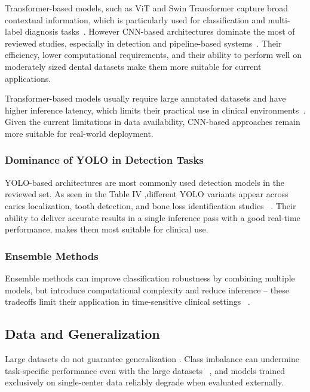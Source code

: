 \documentclass[conference]{IEEEtran}
\begin{document}
Transformer-based models, such as ViT and Swin Transformer capture broad contextual information, which is particularly used for classification and multi-label diagnosis tasks~\cite{vannistelrooij2024combining}. However CNN-based architectures dominate the most of reviewed studies, especially in detection and pipeline-based systems~\cite{kaushik2025densenet201}. Their efficiency, lower computational requirements, and their ability to perform well on moderately sized dental datasets make them more suitable for current applications.

Transformer-based models usually require large annotated datasets and have higher inference latency, which limits their practical use in clinical environments~\cite{vannistelrooij2024combining}. Given the current limitations in data availability, CNN-based approaches remain more suitable for real-world deployment.

\subsubsection{Dominance of YOLO in Detection Tasks}

YOLO-based architectures are most commonly used detection models in the reviewed set. As seen in the Table IV ,different YOLO variants appear across  caries localization, tooth detection, and bone loss identification studies ~\cite{nassiri2025yolo}. Their ability to deliver accurate results in a single inference pass with a good real-time performance, makes them most suitable for clinical use.


\subsubsection{Ensemble Methods}

Ensemble methods can improve classification robustness by combining multiple models, but introduce computational complexity and reduce inference -- these tradeoffs limit their application in time-sensitive clinical settings ~\cite{gamal2025automated}.

\subsection{Data and Generalization}

Large datasets do not guarantee generalization . Class imbalance can undermine task-specific performance even with the large datasets ~\cite{kaushik2025densenet201}, and models trained exclusively on single-center data  reliably degrade when evaluated  externally.
\end{document}
